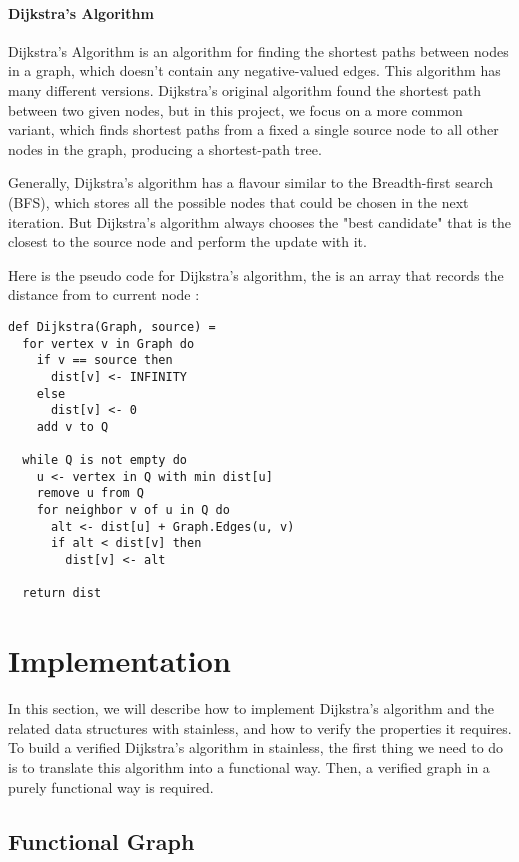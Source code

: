 \documentclass[11pt,a4paper]{article}
\begin{document}
\paragraph{Dijkstra's Algorithm}
Dijkstra's Algorithm\cite{goldberg1993heuristic} is an algorithm for finding the shortest paths between nodes in a graph, which doesn't contain any negative-valued edges. This algorithm has many different versions. Dijkstra's original algorithm found the shortest path between two given nodes, but in this project, we focus on a more common variant, which finds shortest paths from a fixed a single source node to all other nodes in the graph, producing a shortest-path tree. 

Generally, Dijkstra's algorithm has a flavour similar to the Breadth-first search (BFS), which stores all the possible nodes that could be chosen in the next iteration. But Dijkstra's algorithm always chooses the "best candidate" that is the closest to the source node and perform the update with it. 

Here is the pseudo code for Dijkstra's algorithm, the  is an array that records the distance from  to current node :

\begin{lstlisting}
def Dijkstra(Graph, source) =
  for vertex v in Graph do
    if v == source then 
      dist[v] <- INFINITY
    else
      dist[v] <- 0
    add v to Q

  while Q is not empty do
    u <- vertex in Q with min dist[u]
    remove u from Q
    for neighbor v of u in Q do
      alt <- dist[u] + Graph.Edges(u, v)
      if alt < dist[v] then
        dist[v] <- alt

  return dist
\end{lstlisting}

\section{Implementation}
In this section, we will describe how to implement Dijkstra's algorithm and the related data structures with stainless, and how to verify the properties it requires. 
To build a verified Dijkstra's algorithm in stainless, the first thing we need to do
is to translate this algorithm into a functional way. Then, a verified graph in a purely functional way is required. 

\subsection{Functional Graph}
\end{document}
